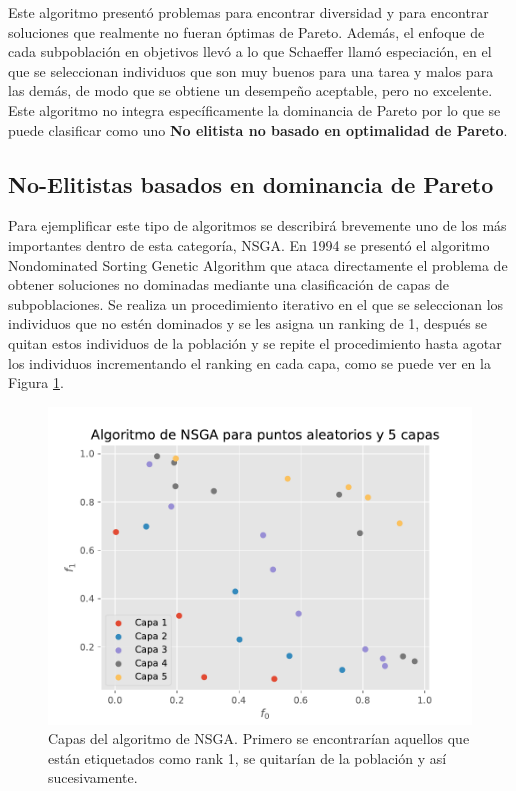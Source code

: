 Este algoritmo presentó problemas para encontrar diversidad y para encontrar soluciones que realmente no fueran óptimas de Pareto. Además, el enfoque de cada subpoblación en objetivos llevó a lo que Schaeffer llamó especiación, en el que se seleccionan individuos que son muy buenos para una tarea y malos para las demás, de modo que se obtiene un desempeño aceptable, pero no excelente. Este algoritmo no integra específicamente la dominancia de Pareto por lo que se puede clasificar como uno \textbf{No elitista no basado en optimalidad de Pareto}.

\subsection*{No-Elitistas basados en dominancia de Pareto}

Para ejemplificar este tipo de algoritmos se describirá brevemente uno de los más importantes dentro de esta categoría, NSGA. En 1994 se presentó el algoritmo Nondominated Sorting Genetic Algorithm \cite{srinivasMuiltiobjectiveOptimizationUsing1994} que ataca directamente el problema de obtener soluciones no dominadas mediante una clasificación de capas de subpoblaciones. Se realiza un procedimiento iterativo en el que se seleccionan los individuos que no estén dominados y se les asigna un ranking de 1, después se quitan estos individuos de la población y se repite el procedimiento hasta agotar los individuos incrementando el ranking en cada capa, como se puede ver en la Figura \ref{fig:nsga1}.

\begin{figure}[H]
    \centering
    \includegraphics[width=\textwidth]{Figuras/nds.pdf}
    \caption[NSGA]{Capas del algoritmo de NSGA. Primero se encontrarían aquellos que están etiquetados como rank 1, se quitarían de la población y así sucesivamente.}
    \label{fig:nsga1}
\end{figure}

